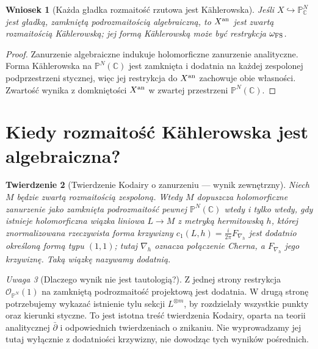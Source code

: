 \documentclass[11pt,a4paper,openany]{report}
\numberwithin{equation}{section}
\theoremstyle{plain}
\newtheorem{twierdzenie}{Twierdzenie}[section]
\newtheorem{wniosek}[twierdzenie]{Wniosek}
\theoremstyle{definition}
\theoremstyle{remark}
\newtheorem{uwaga}[twierdzenie]{Uwaga}
\newcommand{\C}{\mathbb C}
\newcommand{\PP}{\mathbb P}
\begin{document}
\begin{wniosek}[Każda gładka rozmaitość rzutowa jest Kählerowska]
Jeśli $X\hookrightarrow\PP^N_\C$ jest gładką, zamkniętą
podrozmaitością algebraiczną, to $X^{\rm an}$ jest
zwartą rozmaitością Kählerowską; jej formą
Kählerowską może być restrykcja $\omega_{\rm FS}$.
\end{wniosek}
\begin{proof}
Zanurzenie algebraiczne indukuje holomorficzne
zanurzenie analityczne. Forma Kählerowska na
$\PP^N(\C)$ jest zamknięta i dodatnia na
każdej zespolonej podprzestrzeni stycznej, więc
jej restrykcja do $X^{\rm an}$ zachowuje obie własności.
Zwartość wynika z domkniętości $X^{\rm an}$
w zwartej przestrzeni $\PP^N(\C)$.
\end{proof}

\section{Kiedy rozmaitość Kählerowska jest algebraiczna?}
\label{sec:ga9-kodaira}

\begin{twierdzenie}[Twierdzenie Kodairy o zanurzeniu — wynik zewnętrzny]
\label{tw:ga9-kodaira}
Niech $M$ będzie zwartą rozmaitością zespoloną.
Wtedy $M$ dopuszcza holomorficzne zanurzenie jako
zamknięta podrozmaitość pewnej $\PP^N(\C)$ wtedy
i tylko wtedy, gdy istnieje holomorficzna wiązka
liniowa $L\to M$ z metryką hermitowską $h$,
której znormalizowana rzeczywista forma krzywizny
$c_1(L,h)=\frac{i}{2\pi}F_{\nabla_h}$ jest dodatnio
określoną formą typu $(1,1)$; tutaj $\nabla_h$ oznacza
połączenie Cherna, a $F_{\nabla_h}$ jego krzywiznę.
Taką wiązkę nazywamy \emph{dodatnią}.
\end{twierdzenie}

\begin{uwaga}[Dlaczego wynik nie jest tautologią?]
Z jednej strony restrykcja $\mathcal O_{\PP^N}(1)$
na zamkniętą podrozmaitość projektową jest dodatnia.
W drugą stronę potrzebujemy wykazać istnienie tylu
sekcji $L^{\otimes m}$, by rozdzielały wszystkie
punkty oraz kierunki styczne. To jest istotna treść
twierdzenia Kodairy, oparta na teorii analitycznej
$\bar\partial$ i odpowiednich twierdzeniach o znikaniu.
Nie wyprowadzamy jej tutaj wyłącznie z dodatniości
krzywizny, nie dowodząc tych wyników pośrednich.
\end{uwaga}
\end{document}
